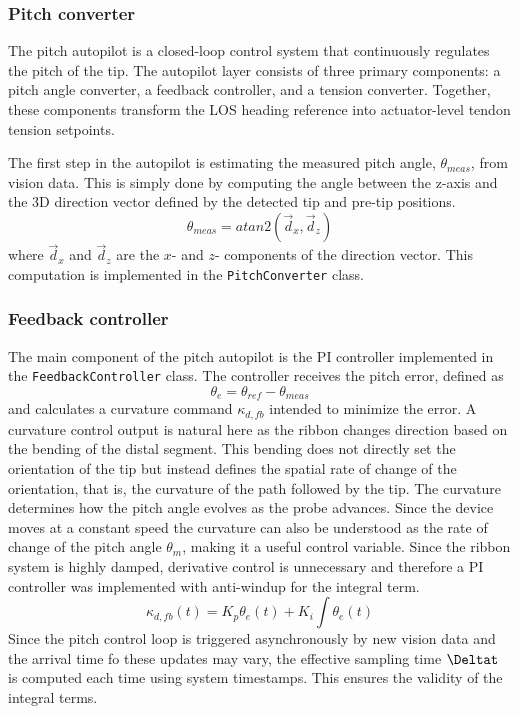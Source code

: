 \subsubsection{Pitch converter}
The pitch autopilot is a closed-loop control system that continuously regulates the pitch of the tip. The autopilot layer consists of three primary components: a pitch angle converter, a feedback controller, and a tension converter. Together, these components transform the LOS heading reference into actuator-level tendon tension setpoints.

The first step in the autopilot is estimating the measured pitch angle, \(\theta_{meas}\), from vision data. This is simply done by computing the angle between the z-axis and the 3D direction vector defined by the detected tip and pre-tip positions. 
\begin{equation}
    \theta_{meas} = atan2(\vec{d}_x,\vec{d}_z)
\end{equation}
where \(\vec{d}_x\) and \(\vec{d}_z\) are the \(x\)- and \(z\)- components of the direction vector. This computation is implemented in the \texttt{PitchConverter} class.

\subsubsection{Feedback controller}
The main component of the pitch autopilot is the PI controller implemented in the \texttt{FeedbackController} class. The controller receives the pitch error, defined as 
\begin{equation}
    \theta_e = \theta_{ref} - \theta_{meas}
\end{equation}
and calculates a curvature command \(\kappa_{d,fb}\) intended to minimize the error. 
\newline \newline 
A curvature control output is natural here as the ribbon changes direction based on the bending of the distal segment. This bending does not directly set the orientation of the tip but instead defines the spatial rate of change of the orientation, that is, the curvature of the path followed by the tip. The curvature determines how the pitch angle evolves as the probe advances. Since the device moves at a constant speed the curvature can also be understood as the rate of change of the pitch angle \(\theta_m\), making it a useful control variable.
\newline \newline
Since the ribbon system is highly damped, derivative control is unnecessary and therefore a PI controller was implemented with anti-windup for the integral term.
\begin{equation}
    \kappa_{d,fb}(t) = K_p \theta_e(t) + K_i \int \theta_e(t)
\end{equation}
Since the pitch control loop is triggered asynchronously by new vision data and the arrival time fo these updates may vary, the effective sampling time \(\Deltat\) is computed each time using system timestamps. This ensures the validity of the integral terms.

